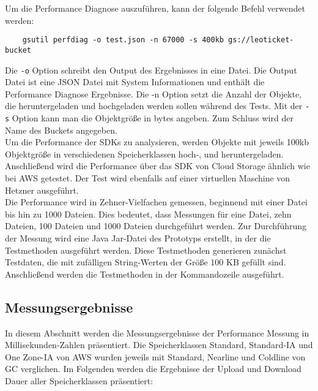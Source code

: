 Um die Performance Diagnose auszuführen, kann der folgende Befehl verwendet werden:

\begin{lstlisting}
	gsutil perfdiag -o test.json -n 67000 -s 400kb gs://leoticket-bucket
\end{lstlisting}

Die \verb|-o| Option schreibt den Output des Ergebnisses in eine Datei. Die Output Datei ist eine JSON Datei mit System Informationen und enthält die Performance Diagnose Ergebnisse. Die -n Option setzt die Anzahl der Objekte, die heruntergeladen und hochgeladen werden sollen während des Tests. Mit der \verb|-s| Option kann man die Objektgröße in bytes angeben. Zum Schluss wird der Name des Buckets angegeben.\\

Um die Performance der SDKs zu analysieren, werden Objekte mit jeweils 100kb Objektgröße in verschiedenen Speicherklassen hoch-, und heruntergeladen. Anschließend wird die Performance über das SDK von Cloud Storage ähnlich wie bei AWS getestet. Der Test wird ebenfalls auf einer virtuellen Maschine von Hetzner ausgeführt.\\

Die Performance wird in Zehner-Vielfachen gemessen, beginnend mit einer Datei bis hin zu 1000 Dateien. Dies bedeutet, dass Messungen für eine Datei, zehn Dateien, 100 Dateien und 1000 Dateien durchgeführt werden. Zur Durchführung der Messung wird eine Java Jar-Datei des Prototyps erstellt, in der die Testmethoden ausgeführt werden. Diese Testmethoden generieren zunächst Testdaten, die mit zufälligen String-Werten der Größe 100 KB gefüllt sind. Anschließend werden die Testmethoden in der Kommandozeile ausgeführt.

\newpage

\subsection{Messungsergebnisse}

In diesem Abschnitt werden die Messungsergebnisse der Performance Messung in Millisekunden-Zahlen präsentiert. Die Speicherklassen Standard, Standard-IA und One Zone-IA von AWS wurden jeweils mit Standard, Nearline und Coldline von GC verglichen. Im Folgenden werden die Ergebnisse der Upload und Download Dauer aller Speicherklassen präsentiert: 


